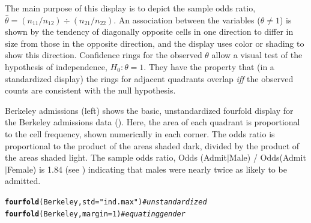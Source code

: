 \documentclass[11pt]{book}\usepackage[]{graphicx}\usepackage[]{color}
\makeatletter
\newcommand{\hlnum}[1]{\textcolor[rgb]{0.686,0.059,0.569}{#1}}%
\newcommand{\hlstr}[1]{\textcolor[rgb]{0.192,0.494,0.8}{#1}}%
\newcommand{\hlcom}[1]{\textcolor[rgb]{0.678,0.584,0.686}{\textit{#1}}}%
\newcommand{\hlstd}[1]{\textcolor[rgb]{0.345,0.345,0.345}{#1}}%
\newcommand{\hlkwc}[1]{\textcolor[rgb]{0.333,0.667,0.333}{#1}}%
\newcommand{\hlkwd}[1]{\textcolor[rgb]{0.737,0.353,0.396}{\textbf{#1}}}%
\newenvironment{kframe}{%
 \def\at@end@of@kframe{}%
 \ifinner\ifhmode%
  \def\at@end@of@kframe{\end{minipage}}%
  \begin{minipage}{\columnwidth}%
 \fi\fi%
 \def\FrameCommand##1{\hskip\@totalleftmargin \hskip-\fboxsep
 \colorbox{shadecolor}{##1}\hskip-\fboxsep
     \hskip-\linewidth \hskip-\@totalleftmargin \hskip\columnwidth}%
 \MakeFramed {\advance\hsize-\width
   \@totalleftmargin\z@ \linewidth\hsize
   \@setminipage}}%
 {\par\unskip\endMakeFramed%
 \at@end@of@kframe}
\newenvironment{knitrout}{}{} %
\renewenvironment{knitrout}{\small\renewcommand{\baselinestretch}{.85}}{} %
\makeatother
\begin{document}
The main purpose of this display is to depict the sample odds ratio,
\(\hat{\theta} = (n_{11} /  n_{12} )
\div  (n_{21} /  n_{22} )\).  
An association between the variables
(\(\theta \neq 1\)) is shown by the tendency of diagonally opposite
cells in one direction to differ in size from those in the opposite
direction, and the display uses color or shading to show this
direction.  Confidence rings for the observed \(\theta\) allow a
visual test of the hypothesis of independence,
 \(H_0 :  \theta  =  1\).  They have
the property that (in a standardized display) the rings for adjacent quadrants overlap \emph{iff}
the observed counts are consistent with the null hypothesis.

\begin{Example}[berkeley2]{Berkeley admissions}
(left) shows the basic, unstandardized 
fourfold display for the
Berkeley admissions data ().
Here, the area of each quadrant is proportional to the cell frequency,
shown numerically in each corner.
The odds ratio is proportional to the product of the areas
shaded dark, divided by the product of the areas shaded light.
The sample odds ratio, Odds (Admit\(|\)Male) / Odds(Admit\(|\)Female) is
1.84 (see )
indicating that males were nearly twice as likely to be admitted.

\begin{knitrout}
\color{fgcolor}\begin{kframe}
\begin{alltt}
\hlkwd{fourfold}\hlstd{(Berkeley,} \hlkwc{std}\hlstd{=}\hlstr{"ind.max"}\hlstd{)}   \hlcom{# unstandardized}
\hlkwd{fourfold}\hlstd{(Berkeley,} \hlkwc{margin}\hlstd{=}\hlnum{1}\hlstd{)}        \hlcom{# equating gender}
\end{alltt}
\end{kframe}\begin{figure}[htbp]



\end{figure}
\end{knitrout}
\end{Example}
\end{document}
